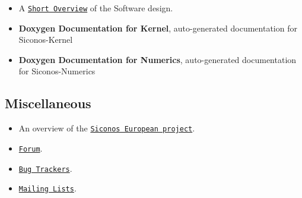 \begin{itemize}
\item A \href{http://siconos.gforge.inria.fr/Documentation/SiconosOverview/CapriSept2006.pdf}{\tt Short Overview} of the Software design.\end{itemize}


\begin{itemize}
\item {\bf Doxygen Documentation for Kernel}, auto-generated documentation for Siconos-Kernel\end{itemize}


\begin{itemize}
\item {\bf Doxygen Documentation for Numerics}, auto-generated documentation for Siconos-Numerics\end{itemize}
\hypertarget{SiconosDocList_miscDoc}{}\subsection{Miscellaneous}\label{SiconosDocList_miscDoc}
\begin{itemize}
\item An overview of the \href{http://siconos.gforge.inria.fr/docDev/index.html}{\tt Siconos European project}.\end{itemize}


\begin{itemize}
\item \href{https://gforge.inria.fr/forum/?group_id=9}{\tt Forum}.\end{itemize}


\begin{itemize}
\item \href{https://gforge.inria.fr/tracker/?group_id=9}{\tt Bug Trackers}.\end{itemize}


\begin{itemize}
\item \href{https://gforge.inria.fr/mail/?group_id=9}{\tt Mailing Lists}. \end{itemize}
